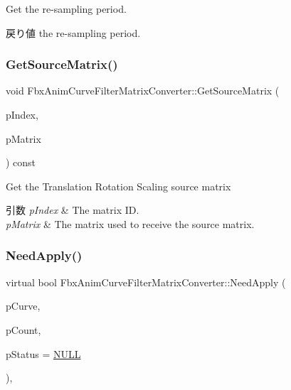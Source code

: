 Get the re-\/sampling period. \begin{DoxyReturn}{戻り値}
the re-\/sampling period. 
\end{DoxyReturn}
\mbox{\label{class_fbx_anim_curve_filter_matrix_converter_a38313c4b68b33172198ca19ef957bc1c}} 
\subsubsection{\texorpdfstring{Get\+Source\+Matrix()}{GetSourceMatrix()}}
{\footnotesize\ttfamily void Fbx\+Anim\+Curve\+Filter\+Matrix\+Converter\+::\+Get\+Source\+Matrix (\begin{DoxyParamCaption}\item[{\hyperlink{class_fbx_anim_curve_filter_matrix_converter_a41638d5acd6d14ef0f095ab75b18ee69}{E\+Matrix\+Index}}]{p\+Index,  }\item[{\hyperlink{class_fbx_a_matrix}{Fbx\+A\+Matrix} \&}]{p\+Matrix }\end{DoxyParamCaption}) const}

Get the Translation Rotation Scaling source matrix 
\begin{DoxyParams}{引数}
{\em p\+Index} & The matrix ID. \\
\hline
{\em p\+Matrix} & The matrix used to receive the source matrix. \\
\hline
\end{DoxyParams}
\mbox{\label{class_fbx_anim_curve_filter_matrix_converter_a7cae8d7e31ab1cf2437de8636a5b4916}} 
\subsubsection{\texorpdfstring{Need\+Apply()}{NeedApply()}\hspace{0.1cm}{\footnotesize\ttfamily [1/6]}}
{\footnotesize\ttfamily virtual bool Fbx\+Anim\+Curve\+Filter\+Matrix\+Converter\+::\+Need\+Apply (\begin{DoxyParamCaption}\item[{\hyperlink{class_fbx_anim_curve}{Fbx\+Anim\+Curve} $\ast$$\ast$}]{p\+Curve,  }\item[{int}]{p\+Count,  }\item[{\hyperlink{class_fbx_status}{Fbx\+Status} $\ast$}]{p\+Status = {\ttfamily \hyperlink{fbxarch_8h_a070d2ce7b6bb7e5c05602aa8c308d0c4}{N\+U\+LL}} }\end{DoxyParamCaption})\hspace{0.3cm}{\ttfamily [inline]}, {\ttfamily [virtual]}}

